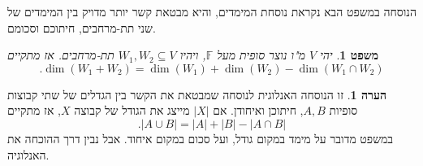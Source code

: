 \documentclass[12pt]{report}
\theoremstyle{plain}
\newtheorem{theorem}{משפט}[chapter]
\theoremstyle{definition}
\newtheorem{remark}{הערה}[chapter]
\newcommand{\F}{\mathbb{F}}
\newcommand{\0}{\mathbf{0}}
\begin{document}
הנוסחה במשפט הבא נקראת נוסחת המימדים, והיא מבטאת קשר יותר מדויק בין המימדים של שני תת-מרחבים, חיתוכם וסכומם.

\begin{theorem}\label{thm:dim-formula}
יהי 
$V$
מ"ו נוצר סופית מעל
$\F$,
ויהיו
$W_1,W_2\subseteq V$
תת-מרחבים. אז מתקיים
$$
.\dim(W_1+W_2)=\dim(W_1)+\dim(W_2)-\dim(W_1\cap W_2)
$$
\end{theorem}

\begin{remark}
זו הנוסחה האנלוגית לנוסחה שמבטאת את הקשר בין הגדלים של שתי קבוצות סופיות
$A,B$,
חיתוכן ואיחודן. אם
$|X|$
מייצג את הגודל של קבוצה 
$X$,
אז מתקיים
$$
.|A\cup B|=|A|+|B|-|A\cap B|
$$
במשפט מדובר על מימד במקום גודל, ועל סכום במקום איחוד. אבל נבין דרך ההוכחה את האנלוגיה.
\end{remark}
\end{document}
